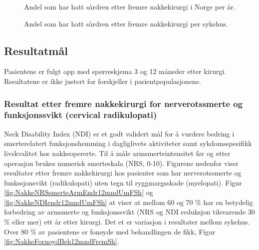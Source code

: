 \documentclass [norsk,a4paper,twoside]{article}\usepackage[]{graphicx}\usepackage[]{color}
\begin{document}
\begin{figure}[ht]
\caption{\label{fig:NakkeSaardrenUmFTid} Andel som har hatt sårdren etter fremre nakkekirurgi i Norge per år.}
\end{figure}

\begin{figure}[ht]
\caption{\label{fig:NakkeSaardrenUmFSh} Andel som har hatt sårdren etter fremre nakkekirurgi per sykehus.}
\end{figure}

\clearpage

\subsection{Resultatmål}

Pasientene er fulgt opp med spørreskjema 3 og 12 måneder etter kirurgi.
Resultatene er ikke justert for forskjeller i pasientpopulasjonene.


\subsubsection{Resultat etter fremre nakkekirurgi for nerverotssmerte og funksjonssvikt (cervical radikulopati)}




Neck Disability Index (NDI) er et godt validert mål for å vurdere bedring i smerterelatert
funksjonshemming  i dagliglivets aktiviteter samt sykdomsspesifikk livskvalitet hos 
nakkeopererte. Til å måle armsmerteintensitet før og etter operasjon brukes numerisk 
smerteskala (NRS, 0-10). Figurene nedenfor viser resultater etter fremre nakkekirurgi hos 
pasienter som har nerverotssmerte og funkssjonsvikt (radikulopati) uten tegn til 
ryggmargsskade 
(myelopati). Figur \ref{fig:NakkeNRSsmerteArmEndr12mndUmFSh} og  
\ref{fig:NakkeNDIendr12mndUmFSh} at viser at mellom 60 og 70 \% har en betydelig forbedring av 
armsmerte og funksjonssvikt (NRS og NDI reduksjon tilsvarende 30 \%  eller mer) ett år etter 
kirurgi. Det et er variasjon i resultater mellom sykehus. Over 80 \% av pasientene er fonøyde 
med behandlingen de fikk, Figur \ref{fig:NakkeFornoydBeh12mndFremSh}.  
\end{document}
